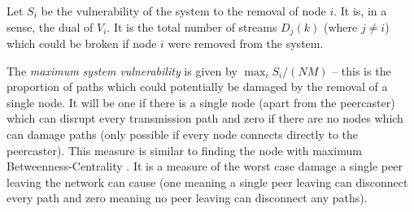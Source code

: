 Let $S_i$ be the vulnerability of the system to the removal of node $i$.
It is, in a sense, the dual of $V_i$.  It is the total number of streams
$D_j(k)$ (where $j \neq i$) which could be broken if node $i$ were
removed from the system.

\begin{definition}
The {\em maximum system vulnerability\/} is
given by $\max_i S_i/(NM)$ -- 
this is the proportion of paths which could potentially be damaged by the 
removal of a
single node.  It will be one if there is a single node (apart from the peercaster)
which can disrupt every transmission path and zero if there are no nodes which
can damage paths (only possible if every node connects directly to the peercaster).
This measure is similar to finding the node with maximum
Betweenness-Centrality \cite{betweenness}.  It is a measure of the worst case
damage a single peer leaving the network can cause (one meaning a single peer leaving
can disconnect every path and zero meaning no peer leaving can disconnect any paths).
\end{definition}


